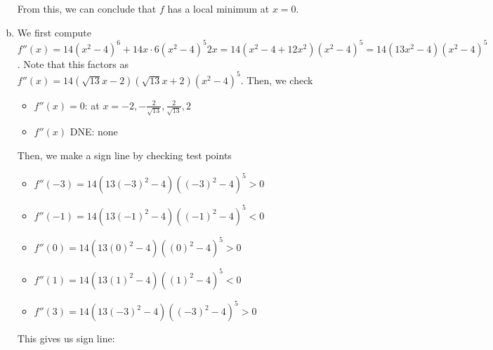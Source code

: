 \documentclass[11pt]{exam}
\begin{document}
\begin{questions}
\begin{solution}
\begin{enumerate}[(a)]
From this, we can conclude that \(f\) has a local minimum at \(x=0\).
\item We first compute \(f''(x) = 14(x^2-4)^6+14x \cdot 6(x^2-4)^5 2x
  = 14(x^2-4+12x^2)(x^2-4)^5 = 14(13x^2-4)(x^2-4)^5\). Note that this factors as \(f''(x) =
  14(\sqrt{13}x-2)(\sqrt{13}x+2)(x^2-4)^5\). Then, we check
  \begin{itemize}
  \item \(f''(x) = 0\): at \(x=-2,-\frac{2}{\sqrt{13}},\frac{2}{\sqrt{13}},2\)
  \item \(f''(x)\) DNE: none
  \end{itemize}
  Then, we make a sign line by checking test points
  \begin{itemize}
  \item \(f''(-3) = 14(13(-3)^2-4)((-3)^2-4)^5 > 0\)
  \item \(f''(-1) = 14(13(-1)^2-4)((-1)^2-4)^5 < 0 \)
  \item \(f''(0) = 14(13(0)^2-4)((0)^2-4)^5 > 0\)
  \item \(f''(1) = 14(13(1)^2-4)((1)^2-4)^5 < 0\)
  \item \(f''(3) = 14(13(-3)^2-4)((-3)^2-4)^5 > 0\)
  \end{itemize}
        This gives us sign line:


\end{enumerate}
\end{solution}
\end{questions}
\end{document}

